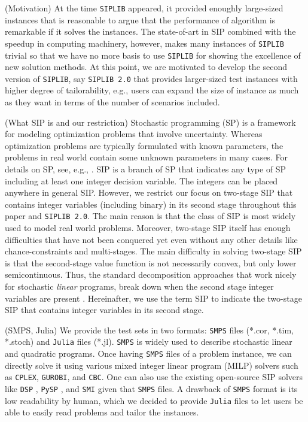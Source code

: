 (Motivation) At the time \texttt{SIPLIB} appeared, it provided enoughly large-sized instances that is reasonable to argue that the performance of algorithm is remarkable if it solves the instances. The state-of-art in SIP combined with the speedup in computing machinery, however, makes many instances of \texttt{SIPLIB} trivial so that we have no more basis to use \texttt{SIPLIB} for showing the excellence of new solution methods. At this point, we are motivated to develop the second version of \texttt{SIPLIB}, say \texttt{SIPLIB 2.0} that provides larger-sized test instances with higher degree of tailorability, e.g., users can expand the size of instance as much as they want in terms of the number of scenarios included.

(What SIP is and our restriction) Stochastic programming (SP) is a framework for modeling optimization problems that involve uncertainty. Whereas optimization problems are typically formulated with known parameters, the problems in real world contain some unknown parameters in many cases. For details on SP, see, e.g., \cite{web:SPS,book:BL2011}. SIP is a branch of SP that indicates any type of SP including at least one integer decision variable. The integers can be placed anywhere in general SIP. However, we restrict our focus on two-stage SIP that contains integer variables (including binary) in its second stage throughout this paper and \texttt{SIPLIB 2.0}. The main reason is that the class of SIP is most widely used to model real world problems. Moreover, two-stage SIP itself has enough difficulties that have not been conquered yet even without any other details like chance-constraints and multi-stages. The main difficulty in solving two-stage SIP is that the second-stage value function is not necessarily convex, but only lower semicontinuous. Thus, the standard decomposition approaches that work nicely for stochastic \textit{linear} programs, break down when the second stage integer variables are present \cite{journal:AG2003}. Hereinafter, we use the term SIP to indicate the two-stage SIP that contains integer variables in its second stage.

(SMPS, Julia)
We provide the test sets in two formats: \texttt{SMPS} files (*.cor, *.tim, *.stoch) and \texttt{Julia} files (*.jl). \texttt{SMPS} is widely used to describe stochastic linear and quadratic programs. Once having \texttt{SMPS} files of a problem instance, we can directly solve it using various mixed integer linear program (MILP) solvers such as \texttt{CPLEX}, \texttt{GUROBI}, and \texttt{CBC}. One can also use the existing open-source SIP solvers like \texttt{DSP} \cite{journal:KZ2015}, \texttt{PySP} \cite{journal:WWH2012}, and \texttt{SMI} \cite{web:SMI} given that \texttt{SMPS} files. A drawback of \texttt{SMPS} format is its low readability by human, which we decided to provide \texttt{Julia} files to let users be able to easily read problems and tailor the instances.

